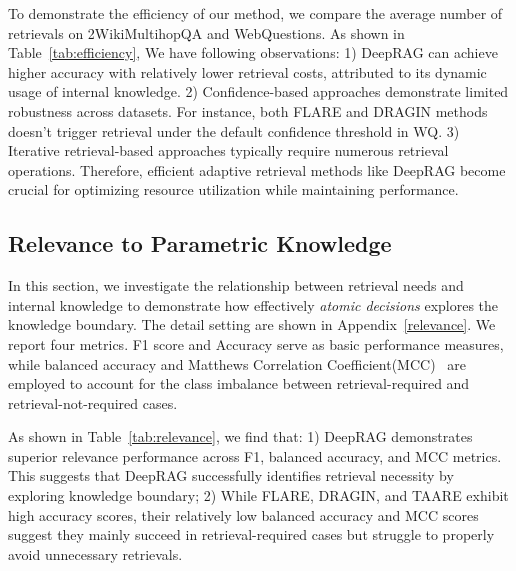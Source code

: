 To demonstrate the efficiency of our method, we compare the average number of retrievals on 2WikiMultihopQA and WebQuestions. As shown in Table~\ref{tab:efficiency}, We have following observations:
1) DeepRAG can achieve higher accuracy with relatively lower retrieval costs, attributed to its dynamic usage of internal knowledge.
% 
2) Confidence-based approaches demonstrate limited robustness across datasets.  
For instance, both FLARE and DRAGIN methods doesn't trigger retrieval under the default confidence threshold in WQ.
% 
3) Iterative retrieval-based approaches typically require numerous retrieval operations.
% 
Therefore, efficient adaptive retrieval methods like DeepRAG become crucial for optimizing resource utilization while maintaining performance.






\subsection{Relevance to Parametric Knowledge}
In this section, we investigate the relationship between retrieval needs and internal knowledge to demonstrate how effectively \textit{atomic decisions} explores the knowledge boundary.
% 
The detail setting are shown in Appendix~\ref{relevance}.
We report four metrics. 
F1 score and Accuracy serve as basic performance measures, while balanced accuracy and Matthews Correlation Coefficient(MCC)~\cite{Wikipedia_PhiCoefficient} are employed to account for the class imbalance between retrieval-required and retrieval-not-required cases. 




As shown in Table~\ref{tab:relevance}, we find that: 1) 
DeepRAG demonstrates superior relevance performance across F1, balanced accuracy, and MCC metrics.
This suggests that DeepRAG successfully identifies retrieval necessity by exploring knowledge boundary;
% 
2) While FLARE, DRAGIN, and TAARE exhibit high accuracy scores, their relatively low balanced accuracy and MCC scores suggest they mainly succeed in retrieval-required cases but struggle to properly avoid unnecessary retrievals.


